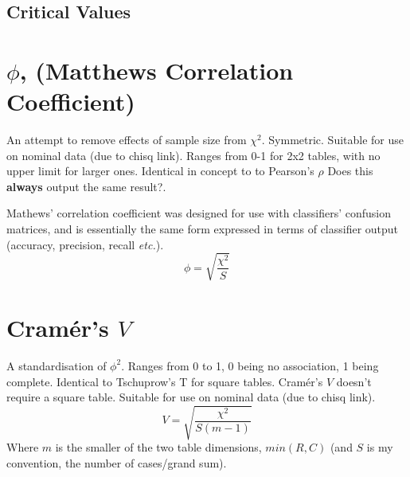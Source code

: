 \documentclass[11pt]{article}
\begin{document}
\subsection{Critical Values}













\section{$\phi$, (Matthews Correlation Coefficient)}
\label{section:phi}
An attempt to remove effects of sample size from $\chi^2$.  Symmetric. Suitable for use on nominal data (due to chisq link). %
Ranges from 0-1 for 2x2 tables, with no upper limit for larger ones.  Identical in concept to to Pearson's $\rho$ {\color{red} Does this \textbf{always} output the same result?}.

Mathews' correlation coefficient was designed for use with classifiers' confusion matrices, and is essentially the same form expressed in terms of classifier output (accuracy, precision, recall \textsl{etc.}). 
$$
\phi = \sqrt{ \frac{\chi^2}{S} }
$$












\section{Cram\'er's $V$}
A standardisation of $\phi^2$.  Ranges from 0 to 1, 0 being no association, 1 being complete.  Identical to Tschuprow's T for square tables.  Cram\'er's $V$ doesn't require a square table.  Suitable for use on nominal data (due to chisq link).
$$
V = \sqrt{ \frac{ \chi^2 }{ S( m - 1 )} }
$$
Where $m$ is the smaller of the two table dimensions, $min(R, C)$  (and $S$ is my convention, the number of cases/grand sum).
\end{document}

